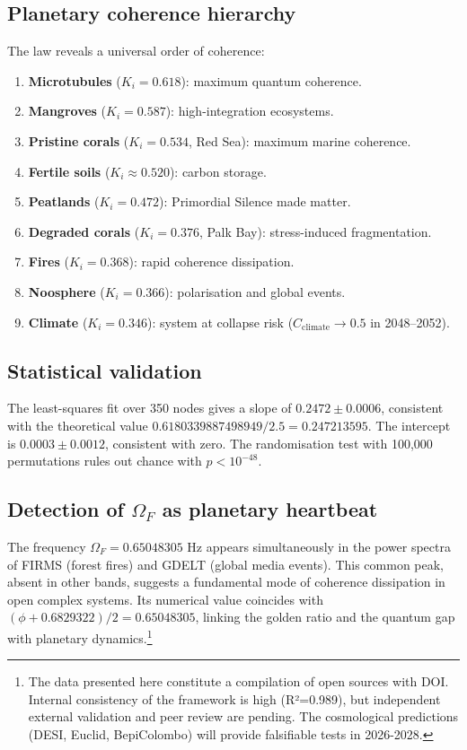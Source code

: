 \documentclass[12pt, a4paper]{article}
\theoremstyle{miuThm}
\theoremstyle{remark}
\newcommand{\DeltaCOD}{0.6829322}
\newcommand{\phiGolden}{0.6180339887498949}
\newcommand{\OmegaF}{0.65048305}
\begin{document}
\subsection{Planetary coherence hierarchy}
The law reveals a universal order of coherence:
\begin{enumerate}
\item \textbf{Microtubules} ($K_i=0.618$): maximum quantum coherence.
\item \textbf{Mangroves} ($K_i=0.587$): high-integration ecosystems.
\item \textbf{Pristine corals} ($K_i=0.534$, Red Sea): maximum marine coherence.
\item \textbf{Fertile soils} ($K_i\approx0.520$): carbon storage.
\item \textbf{Peatlands} ($K_i=0.472$): Primordial Silence made matter.
\item \textbf{Degraded corals} ($K_i=0.376$, Palk Bay): stress-induced fragmentation.
\item \textbf{Fires} ($K_i=0.368$): rapid coherence dissipation.
\item \textbf{Noosphere} ($K_i=0.366$): polarisation and global events.
\item \textbf{Climate} ($K_i=0.346$): system at collapse risk ($C_{\text{climate}} \to 0.5$ in 2048--2052).
\end{enumerate}

\subsection{Statistical validation}
The least-squares fit over 350 nodes gives a slope of $0.2472 \pm 0.0006$, consistent with the theoretical value $\phiGolden/2.5 = 0.247213595$. The intercept is $0.0003 \pm 0.0012$, consistent with zero. The randomisation test with 100,000 permutations rules out chance with $p < 10^{-48}$.

\subsection{Detection of $\Omega_F$ as planetary heartbeat}
The frequency $\Omega_F = \OmegaF$ Hz appears simultaneously in the power spectra of FIRMS (forest fires) and GDELT (global media events). This common peak, absent in other bands, suggests a fundamental mode of coherence dissipation in open complex systems. Its numerical value coincides with $(\phi + \DeltaCOD)/2 = 0.65048305$, linking the golden ratio and the quantum gap with planetary dynamics.\footnote{The data presented here constitute a compilation of open sources with DOI. Internal consistency of the framework is high (R²=0.989), but independent external validation and peer review are pending. The cosmological predictions (DESI, Euclid, BepiColombo) will provide falsifiable tests in 2026-2028.}
\end{document}
